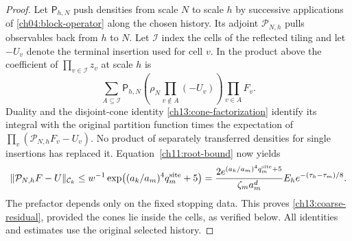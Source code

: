 \begin{proof}
Let $\mathsf P_{h,N}$ push densities from scale $N$ to scale $h$ by
successive applications of \eqref{ch04:block-operator} along the chosen
history. Its adjoint $\mathcal P_{N,h}$ pulls observables back from $h$ to $N$.
Let $\mathcal I$ index the cells of the reflected tiling and let $-U_v$
denote the terminal insertion used for cell $v$. In the product above
the coefficient of $\prod_{v\in\mathcal I}z_v$ at scale $h$ is
\[
 \sum_{A\subseteq\mathcal I}
 \mathsf P_{h,N}\left(\rho_N\prod_{v\notin A}(-U_v)\right)
                       \prod_{v\in A}F_v.
\]
Duality and the disjoint-cone identity
\eqref{ch13:cone-factorization} identify its integral with the original
partition function times the expectation of
$\prod_v(\mathcal P_{N,h}F_v-U_v)$.
No product of separately transferred densities for single insertions has replaced it.
Equation~\eqref{ch11:root-bound} now yields
\[
 \|\mathcal P_{N,h}F-U\|_{\mathcal C_k}
 \le w^{-1}\exp\bigl((a_k/a_m)^4q_m^{\rm site}+5\bigr)
 =\frac{2e^{(a_k/a_m)^4q_m^{\rm site}+5}}{\zeta_ma_m^d}
       E_h e^{-(\tau_h-\tau_m)/8}.
\]
The prefactor depends only on the fixed stopping data. This proves
\eqref{ch13:coarse-residual}, provided the cones lie inside the cells, as verified
below. All identities and estimates use the original selected history.
\end{proof}

